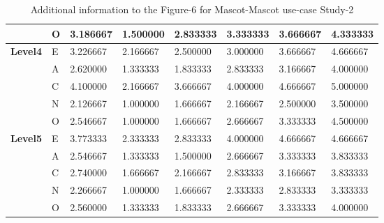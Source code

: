 \begin{table}[H]
\begin{center}
\begin{tabular}{ |p{2cm}| p{0.5cm}|p{1.5cm}|p{1.5cm}| p{1.5cm}|p{1.5cm}|p{1.5cm}| p{1.5cm}| }
&          O& 3.186667 & 1.500000 &2.833333 &3.333333 &3.666667 &4.333333\\
 \hline 
 \hline 
 \multirow{5}{*}{\textbf{Level4}} 
&      E & 3.226667 & 2.166667 &2.500000 &3.000000 &3.666667 &4.666667\\
&     A & 2.620000 & 1.333333 &1.833333 &2.833333 &3.166667 &4.000000\\
& C & 4.100000 & 2.166667 &3.666667 &4.000000& 4.666667 &5.000000\\
&       N& 2.126667 & 1.000000 &1.666667 &2.166667 &2.500000 &3.500000\\
&          O & 2.546667 & 1.000000 &1.666667& 2.666667 &3.333333 &4.500000\\
 \hline 
 \hline 
 \multirow{5}{*}{\textbf{Level5}} 
&      E & 3.773333 & 2.333333 &2.833333& 4.000000 &4.666667 &4.666667\\
&     A & 2.546667 & 1.333333 &1.500000 &2.666667& 3.333333 &3.833333\\
& C & 2.740000 & 1.666667 &2.166667 &2.833333& 3.166667 &3.833333\\
&       N & 2.266667 & 1.000000 &1.666667 &2.333333 &2.833333& 3.333333\\
&          O & 2.560000 & 1.333333 &1.833333 &2.666667 &3.333333 &4.000000\\
 \hline 
\end{tabular}
\end{center}
\caption{Additional information to the Figure-6 for Mascot-Mascot use-case Study-2}
\end{table}

